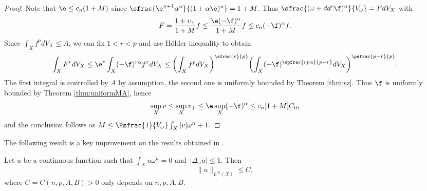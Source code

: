 \begin{proof}
Note that $\e \leq c_n (1+M)$ since $\sfrac{\e^{n+1}\alpha^n}{(1+\alpha \e)^n}=1+M$.
Thus $\sfrac{(\omega+dd^c \f)^n}{V_{\omega}}=F dV_X$
with
\[
F=\frac{1+v_+}{1+M} f \leq \frac{\e (-\f)^{\alpha}}{1+M} f \leq c_n (-\f)^{\alpha} f.
\]
Since $\int_X f^p dV_X \leq A$,
we can fix $1<r<p$ and use
Hölder inequality to obtain
\[
\int_X F^r dV_X \leq \e^r \int_X (-\f)^{r\alpha} f^r dV_X \leq
\biggl( \int_X f^p dV_X \biggr)^{\sfrac{r}{p}}
\biggl( \int_X (-\f)^{\spfrac{rp\alpha}{p-r}} dV_X \biggr)^{\psfrac{p-r}{p}}.
\]
The first integral is controlled by $A$ by assumption, the second one is uniformly bounded by Theorem \ref{thm:sz}.
Thus $\f$ is uniformly bounded by Theorem \ref{thm:uniformMA}, hence
\[
\sup_X v \leq \sup_X v_+ \leq \e \sup_X (-\f)^{\alpha} \leq c_n [1+M] C_0,
\]
and the conclusion follows as $M\leq \Psfrac{1}{V_\omega} \int_X |v| \omega^n+1$.
\end{proof}

The following result is a key improvement on the results obtained in \cite{GPSS22}.

\begin{prop} \label{prop:key}
Let $u$ be a continuous function such that $\int_X\! u \omega^n\!=\!0$
and~\hbox{$|\Delta_{\omega} u| \!\leq\! 1$}. Then
\[
\|u\|_{L^{\infty}(X)} \leq C,
\]
where $C=C(n,p,A,B)>0$ only depends on $n,p,A,B$.
\end{prop}


